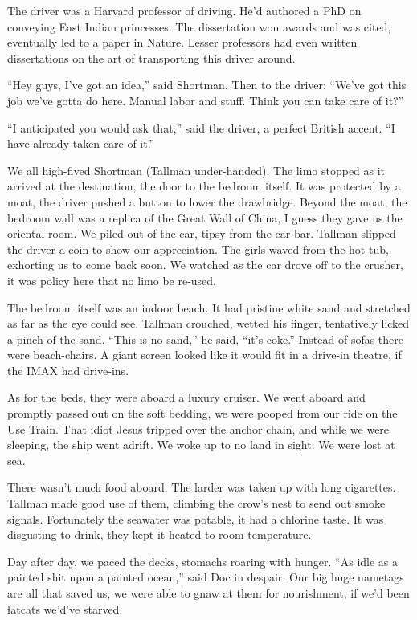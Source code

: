 \documentclass[oneside]{book}
\begin{document}
The driver was a Harvard professor of driving.
He'd authored a PhD on conveying East Indian princesses.
The dissertation won awards and was cited, eventually led to a paper in Nature.
Lesser professors had even written dissertations on the art of transporting this driver around.

``Hey guys, I've got an idea,'' said Shortman.  Then to the driver:  ``We've got this job we've gotta do
here.  Manual labor and stuff.  Think you can take care of it?''

``I anticipated you would ask that,'' said the driver, a perfect British accent.
``I have already taken care of it.''

We all high-fived Shortman (Tallman under-handed).  The limo stopped as it arrived at the destination,
the door to the bedroom itself.  It was protected by a moat, the driver pushed a button to lower
the drawbridge.  Beyond the moat, the bedroom wall was a replica of the Great Wall of China,
I guess they gave us the oriental room.
We piled out of the car, tipsy from the car-bar.  Tallman slipped the driver a
coin to show our appreciation.  The girls waved from the hot-tub, exhorting us to come back soon.
We watched as the car drove off to the crusher, it was policy here that no limo be re-used.

The bedroom itself was an indoor beach.  It had pristine white sand and stretched as far as the eye
could see.  Tallman crouched, wetted his finger, tentatively licked a pinch of the sand.
``This is no sand,'' he said, ``it's coke.''
Instead of sofas there were beach-chairs.  A giant screen looked like
it would fit in a drive-in theatre, if the IMAX had drive-ins.

As for the beds, they were aboard a luxury cruiser.
We went aboard and promptly passed out on the soft bedding, we were pooped from our ride on the Use Train.
That idiot Jesus tripped over the anchor chain, and while we were sleeping, the ship went adrift.
We woke up to no land in sight.  We were lost at sea.

There wasn't much food aboard.  The larder was taken up with long cigarettes.  Tallman made good use of them,
climbing the crow's nest to send out smoke signals.  Fortunately the seawater was potable,
it had a chlorine taste.  It was disgusting to drink,
they kept it heated to room temperature.

Day after day, we paced the decks, stomachs roaring with hunger.  ``As idle as a painted shit upon a painted
ocean,'' said Doc in despair.  Our big huge nametags are all that saved us,
we were able to gnaw at them for nourishment, if we'd been fatcats we'd've starved.
\end{document}
